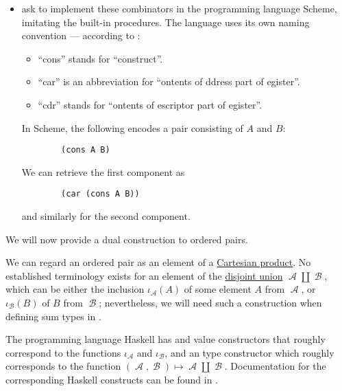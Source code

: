 \begin{example}
\begin{thmenum}
\begin{itemize}
      \item {} ask to implement these combinators in the programming language Scheme, imitating the built-in procedures. The language uses its own naming convention --- according to \cite[115]{AbelsonSussman2012eSICP}:
      \begin{itemize}
        \item \enquote{cons} stands for \enquote{construct}.
        \item \enquote{car} is an abbreviation for \enquote{ontents of ddress part of egister}.
        \item \enquote{cdr} stands for \enquote{ontents of escriptor part of egister}.
      \end{itemize}

      In Scheme, the following encodes a pair consisting of \( A \) and \( B \):
      \begin{verbatim}
        (cons A B)
      \end{verbatim}\vspace{-\baselineskip}

      We can retrieve the first component as
      \begin{verbatim}
        (car (cons A B))
      \end{verbatim}\vspace{-\baselineskip}
      and similarly for the second component.
    \end{itemize}

     We will now provide a dual construction to ordered pairs.

    We can regard an ordered pair as an element of a \hyperref[def:cartesian_product]{Cartesian product}. No established terminology exists for an element of the \hyperref[def:disjoint_union]{disjoint union} \( \mscrA \amalg \mscrB \), which can be either the inclusion \( \iota_\mscrA(A) \) of some element \( A \) from \( \mscrA \), or \( \iota_\mscrB(B) \) of \( B \) from \( \mscrB \); nevertheless, we will need such a construction when defining sum types in .

    The programming language Haskell has  and  value constructors that roughly correspond to the functions \( \iota_\mscrA \) and \( \iota_\mscrB \), and an  type constructor which roughly corresponds to the function \( (\mscrA, \mscrB) \mapsto \mscrA \amalg \mscrB \). Documentation for the corresponding Haskell constructs can be found in \cite{HackageDocs:base-4.21:either}.


\end{thmenum}
\end{example}
